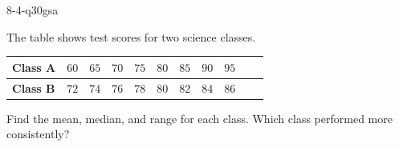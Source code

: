 \begin{practiceQuestion}{8-4-q30}{gsa}
\begin{questionText}
The table shows test scores for two science classes.

\begin{center}
\begin{tabular}{|l|c|c|c|c|c|c|c|c|c|c|}
\hline
\textbf{Class A} & $60$ & $65$ & $70$ & $75$ & $80$ & $85$ & $90$ & $95$ & & \\
\hline
\textbf{Class B} & $72$ & $74$ & $76$ & $78$ & $80$ & $82$ & $84$ & $86$ & & \\
\hline
\end{tabular}
\end{center}

Find the mean, median, and range for each class. Which class performed more consistently?
\end{questionText}
\end{practiceQuestion}
